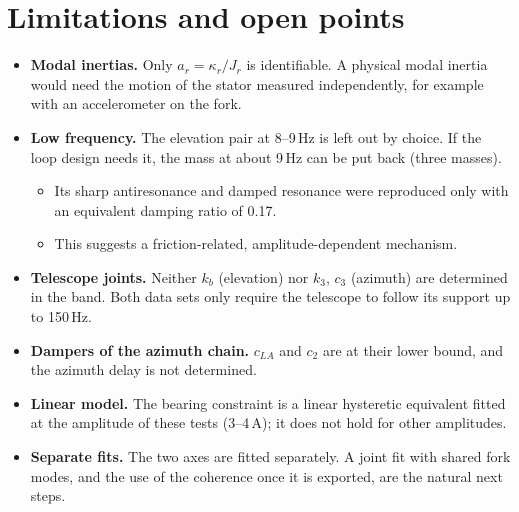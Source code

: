 \documentclass[10pt,a4paper]{article}
\numberwithin{equation}{section}
\begin{document}
\section{Limitations and open points}\label{sec:limits}
\begin{itemize}
\item \textbf{Modal inertias.} Only $a_r=\kappa_r/J_r$ is identifiable. A physical modal inertia would need the motion of the stator measured independently, for example with an accelerometer on the fork.
\item \textbf{Low frequency.} The elevation pair at 8--9\,Hz is left out by choice. If the loop design needs it, the mass at about 9\,Hz can be put back (three masses).
  \begin{itemize}
  \item Its sharp antiresonance and damped resonance were reproduced only with an equivalent damping ratio of 0.17.
  \item This suggests a friction-related, amplitude-dependent mechanism.
  \end{itemize}
\item \textbf{Telescope joints.} Neither $k_b$ (elevation) nor $k_3$, $c_3$ (azimuth) are determined in the band. Both data sets only require the telescope to follow its support up to 150\,Hz.
\item \textbf{Dampers of the azimuth chain.} $c_{LA}$ and $c_2$ are at their lower bound, and the azimuth delay is not determined.
\item \textbf{Linear model.} The bearing constraint is a linear hysteretic equivalent fitted at the amplitude of these tests (3--4\,A); it does not hold for other amplitudes.
\item \textbf{Separate fits.} The two axes are fitted separately. A joint fit with shared fork modes, and the use of the coherence once it is exported, are the natural next steps.
\end{itemize}
\end{document}
